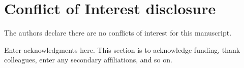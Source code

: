 \documentclass[draft]{agujournal2019}
\begin{document}
\section*{Conflict of Interest disclosure}
The authors declare there are no conflicts of interest for this manuscript.


\acknowledgments
Enter acknowledgments here. This section is to acknowledge funding, thank colleagues, enter any secondary affiliations, and so on.




%
%





%
%
%
%
%
\end{document}
